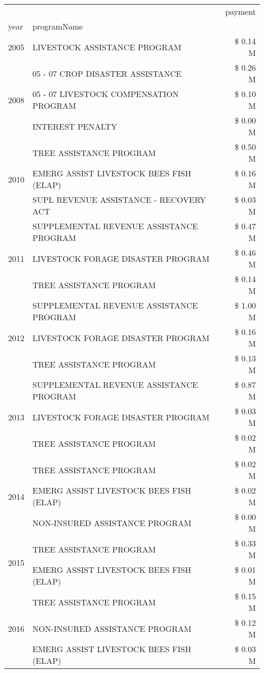 \begin{tabular}{llr}
\toprule
 &  & payment \\
year & programName &  \\
\midrule
2005 & LIVESTOCK ASSISTANCE PROGRAM & \$ 0.14 M \\
\cline{1-3}
\multirow[t]{3}{*}{2008} & 05 - 07 CROP DISASTER ASSISTANCE & \$ 0.26 M \\
 & 05 - 07 LIVESTOCK COMPENSATION PROGRAM & \$ 0.10 M \\
 & INTEREST PENALTY & \$ 0.00 M \\
\cline{1-3}
\multirow[t]{3}{*}{2010} & TREE ASSISTANCE PROGRAM & \$ 0.50 M \\
 & EMERG ASSIST LIVESTOCK BEES FISH (ELAP) & \$ 0.16 M \\
 & SUPL REVENUE ASSISTANCE - RECOVERY ACT & \$ 0.03 M \\
\cline{1-3}
\multirow[t]{3}{*}{2011} & SUPPLEMENTAL REVENUE ASSISTANCE PROGRAM & \$ 0.47 M \\
 & LIVESTOCK FORAGE DISASTER PROGRAM & \$ 0.46 M \\
 & TREE ASSISTANCE PROGRAM & \$ 0.14 M \\
\cline{1-3}
\multirow[t]{3}{*}{2012} & SUPPLEMENTAL REVENUE ASSISTANCE PROGRAM & \$ 1.00 M \\
 & LIVESTOCK FORAGE DISASTER PROGRAM & \$ 0.16 M \\
 & TREE ASSISTANCE PROGRAM & \$ 0.13 M \\
\cline{1-3}
\multirow[t]{3}{*}{2013} & SUPPLEMENTAL REVENUE ASSISTANCE PROGRAM & \$ 0.87 M \\
 & LIVESTOCK FORAGE DISASTER PROGRAM & \$ 0.03 M \\
 & TREE ASSISTANCE PROGRAM & \$ 0.02 M \\
\cline{1-3}
\multirow[t]{3}{*}{2014} & TREE ASSISTANCE PROGRAM & \$ 0.02 M \\
 & EMERG ASSIST LIVESTOCK BEES FISH (ELAP) & \$ 0.02 M \\
 & NON-INSURED ASSISTANCE PROGRAM & \$ 0.00 M \\
\cline{1-3}
\multirow[t]{2}{*}{2015} & TREE ASSISTANCE PROGRAM & \$ 0.33 M \\
 & EMERG ASSIST LIVESTOCK BEES FISH (ELAP) & \$ 0.01 M \\
\cline{1-3}
\multirow[t]{3}{*}{2016} & TREE ASSISTANCE PROGRAM & \$ 0.15 M \\
 & NON-INSURED ASSISTANCE PROGRAM & \$ 0.12 M \\
 & EMERG ASSIST LIVESTOCK BEES FISH (ELAP) & \$ 0.03 M \\

\end{tabular}
